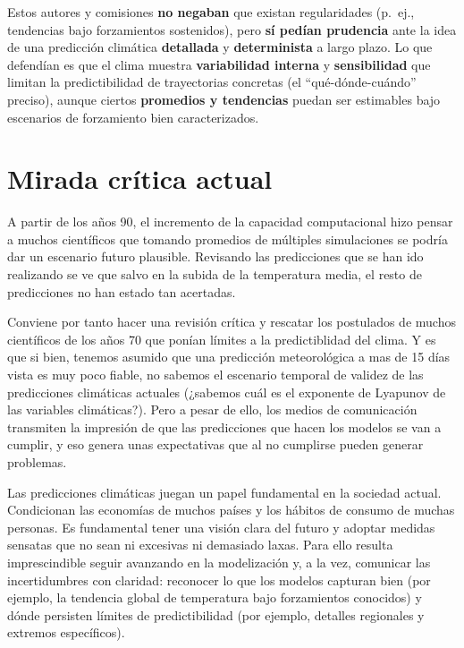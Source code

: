 \documentclass[
  11pt,
  a4paper,
  DIV=11,
  numbers=noendperiod]{scrreprt}
\begin{document}
Estos autores y comisiones \textbf{no negaban} que existan regularidades
(p.~ej., tendencias bajo forzamientos sostenidos), pero \textbf{sí
pedían prudencia} ante la idea de una predicción climática
\textbf{detallada} y \textbf{determinista} a largo plazo. Lo que
defendían es que el clima muestra \textbf{variabilidad interna} y
\textbf{sensibilidad} que limitan la predictibilidad de trayectorias
concretas (el ``qué-dónde-cuándo'' preciso), aunque ciertos
\textbf{promedios y tendencias} puedan ser estimables bajo escenarios de
forzamiento bien caracterizados.

\section{Mirada crítica actual}\label{mirada-cruxedtica-actual}

A partir de los años 90, el incremento de la capacidad computacional
hizo pensar a muchos científicos que tomando promedios de múltiples
simulaciones se podría dar un escenario futuro plausible. Revisando las
predicciones que se han ido realizando se ve que salvo en la subida de
la temperatura media, el resto de predicciones no han estado tan
acertadas.

Conviene por tanto hacer una revisión crítica y rescatar los postulados
de muchos científicos de los años 70 que ponían límites a la
predictiblidad del clima. Y es que si bien, tenemos asumido que una
predicción meteorológica a mas de 15 días vista es muy poco fiable, no
sabemos el escenario temporal de validez de las predicciones climáticas
actuales (¿sabemos cuál es el exponente de Lyapunov de las variables
climáticas?). Pero a pesar de ello, los medios de comunicación
transmiten la impresión de que las predicciones que hacen los modelos se
van a cumplir, y eso genera unas expectativas que al no cumplirse pueden
generar problemas.

Las predicciones climáticas juegan un papel fundamental en la sociedad
actual. Condicionan las economías de muchos países y los hábitos de
consumo de muchas personas. Es fundamental tener una visión clara del
futuro y adoptar medidas sensatas que no sean ni excesivas ni demasiado
laxas. Para ello resulta imprescindible seguir avanzando en la
modelización y, a la vez, comunicar las incertidumbres con claridad:
reconocer lo que los modelos capturan bien (por ejemplo, la tendencia
global de temperatura bajo forzamientos conocidos) y dónde persisten
límites de predictibilidad (por ejemplo, detalles regionales y extremos
específicos).
\end{document}
